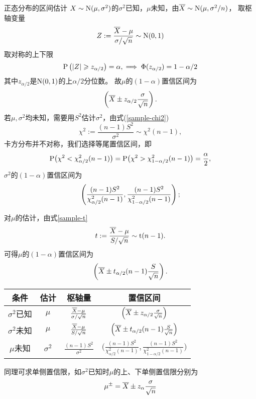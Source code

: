 \begin{example}{正态分布的区间估计}{}
	$X\sim\operatorname{N}(\mu,\sigma^2)$的$\sigma^2$已知，$\mu$未知，由$\overline{X}\sim\operatorname{N}(\mu,\sigma^2/n)$，
	取枢轴变量
	\[
		Z:=\frac{\overline{X}-\mu}{\sigma/\sqrt n}\sim\operatorname{N}(0,1)
	\]
	取对称的上下限
	\[
		\operatorname{P}\left(\left\lvert Z\right\rvert\geqslant z_{\alpha/2}\right)=\alpha,\implies\Phi(z_{\alpha/2})=1-\alpha/2
	\]
	其中$z_{\alpha/2}$是$\operatorname{N}(0,1)$的上$\alpha/2$分位数。
	故$\mu$的$(1-\alpha)$置信区间为
	\begin{equation}
		\left(\overline{X}\pm z_{\alpha/2}\frac\sigma{\sqrt n}\right).
	\end{equation}
	\tcblower
	若$\mu,\sigma^2$均未知，需要用$S^2$估计$\sigma^2$，由式(\ref{sample-chi2})
	\[
		\chi^2:=\frac{(n-1)S^2}{\sigma^2}\sim\chi^2(n-1),
	\]
	卡方分布并不对称，我们选择等尾置信区间，即
	\[
		\operatorname{P}\bigl(\chi^2<\chi_{\alpha/2}^2(n-1)\bigr)=\operatorname{P}\bigl(\chi^2>\chi_{1-\alpha/2}^2(n-1)\bigr)=\frac\alpha{2},
	\]
	$\sigma^2$的$(1-\alpha)$置信区间为
	\begin{equation}
		\left(\frac{(n-1)S^2}{\chi_{\alpha/2}^2(n-1)},\frac{(n-1)S^2}{\chi_{1-\alpha/2}^2(n-1)}\right);
	\end{equation}

	对$\mu$的估计，由式\eqref{sample-t}
	\[
		t:=\frac{\overline{X}-\mu}{S/\sqrt n}\sim\mathrm t(n-1).
	\]
	可得$\mu$的$(1-\alpha)$置信区间为
	\begin{equation}
		\left(\overline{X}\pm t_{\alpha/2}(n-1)\frac{S}{\sqrt n}\right).
	\end{equation}
	\begin{center}
		\begin{tabular}{cccc}
			\toprule
			条件&估计&枢轴量&置信区间\\
			\midrule
			$\sigma^2$已知&$\mu$&$\frac{\overline{X}-\mu}{\sigma/\sqrt n}$&$\left(\overline{X}\pm z_{\alpha/2}\frac\sigma{\sqrt n}\right)$\\[2ex]
			$\sigma^2$未知&$\mu$&$\frac{\overline{X}-\mu}{S/\sqrt n}$&$\left(\overline{X}\pm t_{\alpha/2}(n-1)\frac S{\sqrt n}\right)$\\[2ex]
			$\mu$未知&$\sigma^2$&$\frac{(n-1)S^2}{\sigma^2}$&$\biggl(\frac{(n-1)S^2}{\chi_{\alpha/2}^2(n-1)},\frac{(n-1)S^2}{\chi_{1-\alpha/2}^2(n-1)}\biggr)$\\
			\bottomrule
		\end{tabular}
	\end{center}
	同理可求单侧置信限，如$\sigma^2$已知时$\mu$的上、下单侧置信限分别为
	\[
		\mu^\pm=\overline{X}\pm z_\alpha\frac\sigma{\sqrt n}
	\]
\end{example}
